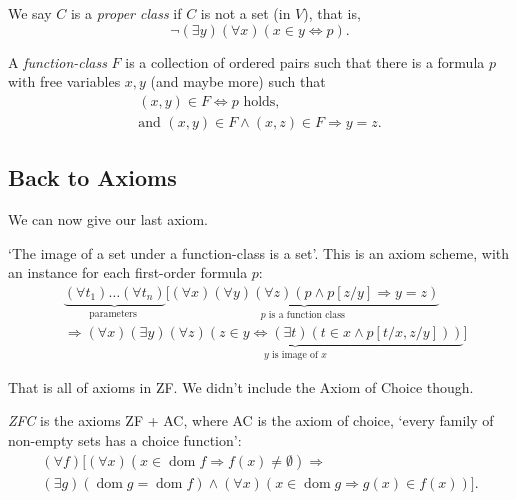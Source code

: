 \documentclass[a3paper, 10pt]{article}
\renewcommand{\vocab}[1]{\emph{#1}}
\begin{document}
\begin{multicols*}{5}
\begin{definition}
  We say $C$ is a \vocab{proper class} if $C$ is not a set (in $V$), that is,
  $$
\lnot (\exists y)(\forall x)(x \in y \Leftrightarrow p).
  $$
\end{definition}
\begin{definition}
  A \vocab{function-class} $F$ is a collection of ordered pairs such that there is a formula $p$ with free variables $x, y$ (and maybe more) such that
  \begin{align*}
(x, y) \in F \Leftrightarrow p\text{ holds},\\ \text{and }(x, y) \in F \land (x, z) \in F \Rightarrow y = z.
  \end{align*}
\end{definition}

\subsection{Back to Axioms}

We can now give our last axiom.

\begin{axiom}
  `The image of a set under a function-class is a set'. This is an axiom scheme,
  with an instance for each first-order formula $p$:
  {\small
  \begin{align*}
      & \underbrace{\left(\forall t_1\right) \ldots\left(\forall t_n\right)}_{\text {parameters }}[\underbrace{(\forall x)(\forall y)(\forall z)(p \land p[z / y] \Rightarrow y=z)}_{p \text { is a function class }} \\
      & \Rightarrow (\forall x) \underbrace{(\exists y)(\forall z)(z \in y \Leftrightarrow(\exists t)(t \in x \land p[t / x , z / y]))}_{y \text { is image of } x}]
  \end{align*}
  }
\end{axiom}

That is all of axioms in ZF. We didn't include the Axiom of Choice though.

\begin{definition}[ZFC]
  \vocab{ZFC} is the axioms ZF + AC, where AC is the axiom of choice, `every family of non-empty sets has a choice function':
  {\small\begin{align*}
    (\forall f)[(\forall x)(x \in \operatorname{dom} f \Rightarrow f(x) \neq \emptyset) \Rightarrow \\
    (\exists g)(\operatorname{dom} g = \operatorname{dom} f) \land (\forall x)(x \in \operatorname{dom}g \Rightarrow g(x) \in f(x))].
  \end{align*}}
\end{definition}


\end{multicols*}
\end{document}
